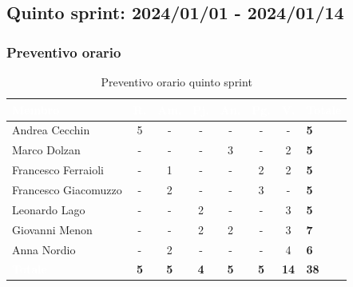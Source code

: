 \newpage

\subsection{Quinto sprint: 2024/01/01 - 2024/01/14}
\subsubsection{Preventivo orario}
{
\setlength{\tabcolsep}{10pt}
\renewcommand{\arraystretch}{1.5}
\begin{table}[h!]
    \centering
    \begin{tabularx}{\textwidth}{| l | c | c | c | c | c | c | X |}
        \hline
        \rowcolor{headerrow} \textbf{\textcolor{white}{Membro}} & \textbf{\textcolor{white}{R.}} & \textbf{\textcolor{white}{Am.}} & \textbf{\textcolor{white}{Pj.}} & \textbf{\textcolor{white}{An.}} & \textbf{\textcolor{white}{Pg.}} & \textbf{\textcolor{white}{V.}} & \textbf{\textcolor{white}{Totale}} \\
        \hline
        Andrea Cecchin & 5 & - & - & - & - & - & \textbf{5} \\
        \hline
        Marco Dolzan & - & - & - & 3 & - & 2 & \textbf{5} \\
        \hline
        Francesco Ferraioli & - & 1 & - & - & 2 & 2 & \textbf{5} \\
        \hline  
        Francesco Giacomuzzo & - & 2 & - & - & 3 & - & \textbf{5} \\
        \hline
        Leonardo Lago & - & - & 2 & - & - & 3 & \textbf{5} \\
        \hline
        Giovanni Menon & - & - & 2 & 2 & - & 3 & \textbf{7} \\
        \hline
        Anna Nordio & - & 2 & - & - & - & 4 & \textbf{6} \\
        \hline
    \cellcolor{headerrow} \textbf{\textcolor{white}{Totale}} & \textbf{5} & \textbf{5} & \textbf{4} & \textbf{5} & \textbf{5} & \textbf{14} & \textbf{38} \\
        \hline
    \end{tabularx} 
    \caption{Preventivo orario quinto sprint}
    \label{tab:preventivoorarioquintosprint}
\end{table}
}


